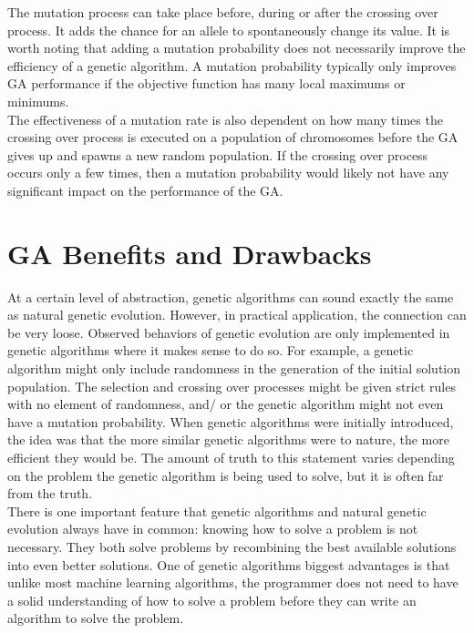 \documentclass[a4paper]{article}
\begin{document}
The mutation process can take place before, during or after the crossing over process. It adds the chance for an allele to spontaneously change its value. It is worth noting that adding a mutation probability does not necessarily improve the efficiency of a genetic algorithm. A mutation probability typically only improves GA performance if the objective function has many local maximums or minimums.\\

The effectiveness of a mutation rate is also dependent on how many times the crossing over process is executed on a population of chromosomes before the GA gives up and spawns a new random population. If the crossing over process occurs only a few times, then a mutation probability would likely not have any significant impact on the performance of the GA.

\section{GA Benefits and Drawbacks}
At a certain level of abstraction, genetic algorithms can sound exactly the same as natural genetic evolution. However, in practical application, the connection can be very loose. Observed behaviors of genetic evolution are only implemented in genetic algorithms where it makes sense to do so. For example, a genetic algorithm might only include randomness in the generation of the initial solution population. The selection and crossing over processes might be given strict rules with no element of randomness, and/ or the genetic algorithm might not even have a mutation probability. When genetic algorithms were initially introduced, the idea was that the more similar genetic algorithms were to nature, the more efficient they would be. The amount of truth to this statement varies depending on the problem the genetic algorithm is being used to solve, but it is often far from the truth.\\

There is one important feature that genetic algorithms and natural genetic evolution always have in common: knowing how to solve a problem is not necessary. They both solve problems by recombining the best available solutions into even better solutions. One of genetic algorithms biggest advantages is that unlike most machine learning algorithms, the programmer does not need to have a solid understanding of how to solve a problem before they can write an algorithm to solve the problem.
\end{document}
